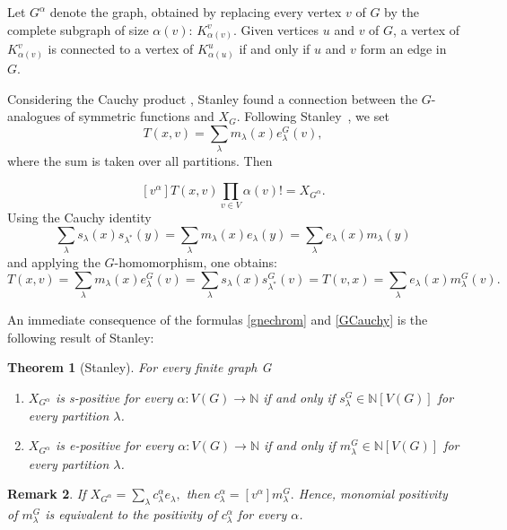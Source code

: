 \documentclass{article}
\theoremstyle{plain}
\newtheorem{thm}{Theorem}[section]
\newtheorem{remark}[thm]{Remark}
\theoremstyle{definition}
\begin{document}
Let $G^\alpha$ denote the graph, obtained by replacing every vertex $v$ of $G$ by the complete subgraph of size $\alpha(v)$: $K_{\alpha(v)}^v$. Given vertices $u$ and $v$ of $G$, a vertex of $K_{\alpha(v)}^v$ is connected to a vertex of $K_{\alpha(u)}^u$ if and only if $u$ and $v$ form an edge in $G$.


Considering the Cauchy product \cite[ch.~4.2]{Macdonald79}, Stanley \cite[p.~6]{Stanley95b} found a connection between the $G$-analogues of symmetric functions and $X_G$. Following Stanley~\cite{Stanley95b}, we set
$$T(x,v) = \sum\limits_\lambda m_\lambda(x)e^G_\lambda(v),$$
where the sum is taken over all partitions. Then 

\begin{equation}\label{gnechrom}
[v^\alpha]T(x,v)\prod\limits_{v\in V}\alpha(v)! =X_{G^\alpha}.
\end{equation}
Using the Cauchy identity 
$$\sum\limits_\lambda s_\lambda(x)s_{\lambda^*}(y)=\sum\limits_\lambda m_\lambda(x)e_\lambda(y) = \sum\limits_\lambda e_\lambda(x)m_\lambda(y)$$
and applying the $G$-homomorphism, one obtains:
\begin{equation}\label{GCauchy}
T(x,v) = \sum\limits_\lambda m_\lambda(x)e^G_\lambda(v) = \sum\limits_\lambda s_\lambda(x)s^G_{\lambda^*}(v)=T(v,x) = \sum\limits_\lambda e_\lambda(x)m^G_\lambda(v).
\end{equation}

An immediate consequence of the formulas \eqref{gnechrom} and
\eqref{GCauchy} is the following result of Stanley:
\begin{thm}[Stanley]\label{poscrit}
 For every finite graph G
\begin{enumerate}
\item $X_{G^\alpha}$ is s-positive for every
  $\alpha:V(G)\rightarrow\mathbb{N}$ if and only if $s_\lambda^G\in
  \mathbb{N}[V(G)]$ for every partition $\lambda$.
\item $X_{G^\alpha}$ is e-positive for every $\alpha:V(G)\rightarrow\mathbb{N}$ if and only if $m_\lambda^G\in \mathbb{N}[V(G)]$ for every partition $\lambda$. 
\end{enumerate}
\end{thm}

\begin{remark}\label{c_m}
If $X_{G^\alpha}=\sum\limits_{\lambda}c^\alpha_{\lambda}e_\lambda,$ then $c_\lambda^\alpha=[v^\alpha]m^G_\lambda.$ Hence, monomial positivity of $m^G_\lambda$ is equivalent to the positivity of $c_\lambda^\alpha$ for every $\alpha$.
\end{remark}
\end{document}
